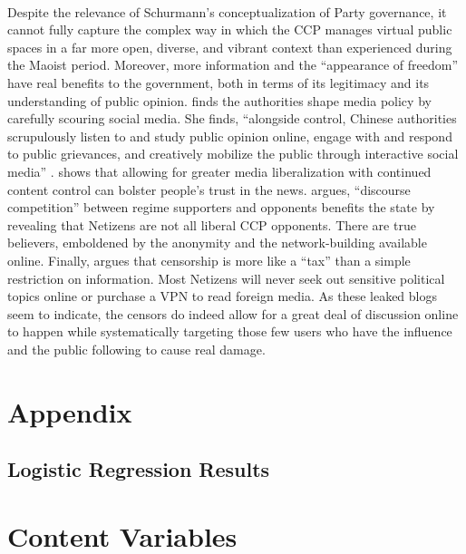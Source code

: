 \documentclass[12pt]{article}
\begin{document}
\begin{CJK*}{UTF8}{gbsn}
\paragraph{} Despite the relevance of Schurmann's conceptualization of Party governance, it cannot fully capture the complex way in which the CCP manages virtual public spaces in a far more open, diverse, and vibrant context than experienced during the Maoist period. Moreover, more information and the ``appearance of freedom'' have real benefits to the government, both in terms of its legitimacy and its understanding of public opinion. \cite{repnikova2017media} finds the authorities shape media policy by carefully scouring social media. She finds, ``alongside control, Chinese authorities scrupulously listen to and study public opinion online, engage with and respond to public grievances, and creatively mobilize the public through interactive social media'' \citep{repnikova2018china}. \cite{stockmann2013media} shows that allowing for greater media liberalization with continued content control can bolster people's trust in the news. \cite{han2018contesting} argues, ``discourse competition'' between regime supporters and opponents benefits the state by revealing that Netizens are not all liberal CCP opponents. There are true believers, emboldened by the anonymity and the network-building available online. Finally, \cite{roberts2018censored} argues that censorship is more like a ``tax'' than a simple restriction on information. Most Netizens will never seek out sensitive political topics online or purchase a VPN to read foreign media. As these leaked blogs seem to indicate, the censors do indeed allow for a great deal of discussion online to happen while systematically targeting those few users who have the influence and the public following to cause real damage.
\newpage

\section*{Appendix}\label{appendix}

\subsection*{Logistic Regression Results}



\section*{Content Variables}



\end{CJK*}
\end{document}

